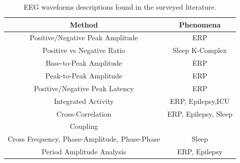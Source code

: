 \documentclass[aspectratio=169]{beamer}
\begin{document}
\begin{frame}  
\begin{table}[h!]
\caption{EEG waveforms descriptions found in the surveyed literature.}
\centering
\begin{tabular}{cc}
\toprule
\textbf{Method}	& \textbf{Phenomena} 	\\
\midrule
Positive/Negative Peak Amplitude & ERP  \\
Positive vs Negative Ratio    & Sleep K-Complex \\
Base-to-Peak Amplitude     & ERP  \\
Peak-to-Peak Amplitude     & ERP  \\
Positive/Negative Peak Latency                                 & ERP    \\
Integrated Activity               & ERP, Epilepsy,ICU  \\
Cross-Correlation                & ERP, Epilepsy, Sleep  \\
Coupling \\ Cross Frequency,  Phase-Amplitude, Phase-Phase     & Sleep \\
Period Amplitude Analysis  & ERP, Epilepsy \\
\bottomrule
\end{tabular}
\label{tab:methods}
\end{table}
\end{frame}  
\end{document}
